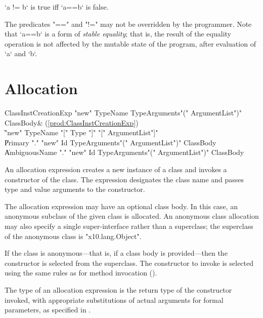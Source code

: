 \xcd`a != b`
is true iff \xcd`a==b` is false.

The predicates \xcd"==" and \xcd"!=" may not be overridden by the programmer.
Note that \xcd`a==b` is a form of \emph{stable equality}; that is, the result of
the equality operation is not affected by the mutable state of the program,
after evaluation of \xcd`a` and \xcd`b`. 


\section{Allocation}
\label{ClassCreation}

\begin{bbgrammar}
 ClassInstCreationExp    \: \xcd"new" TypeName TypeArguments\opt \xcd"(" ArgumentList\opt \xcd")" ClassBody\opt & (\ref{prod:ClassInstCreationExp})\\%
    \| \xcd"new" TypeName \xcd"[" Type \xcd"]" \xcd"[" ArgumentList\opt \xcd"]"\\
    \| Primary \xcd"." \xcd"new" Id TypeArguments\opt \xcd"(" ArgumentList\opt \xcd")" ClassBody\opt\\

    \| AmbiguousName \xcd"." \xcd"new" Id TypeArguments\opt \xcd"(" ArgumentList\opt \xcd")" ClassBody\opt\\

\end{bbgrammar}

An allocation expression creates a new instance of a class and
invokes a constructor of the class.
The expression designates the class name and passes
type and value arguments to the constructor.

The allocation expression may have an optional class body.
In this case, an anonymous subclass of the given class is
allocated.   An anonymous class allocation may also specify a
single super-interface rather than a superclass; the superclass
of the anonymous class is \xcd"x10.lang.Object".

If the class is anonymous---that is, if a class body is
provided---then the constructor is selected from the superclass.
The constructor to invoke is selected using the same rules as
for method invocation ().

The type of an allocation expression
is the return type of the constructor invoked, with appropriate
substitutions  of actual arguments for formal parameters, as
specified in .


